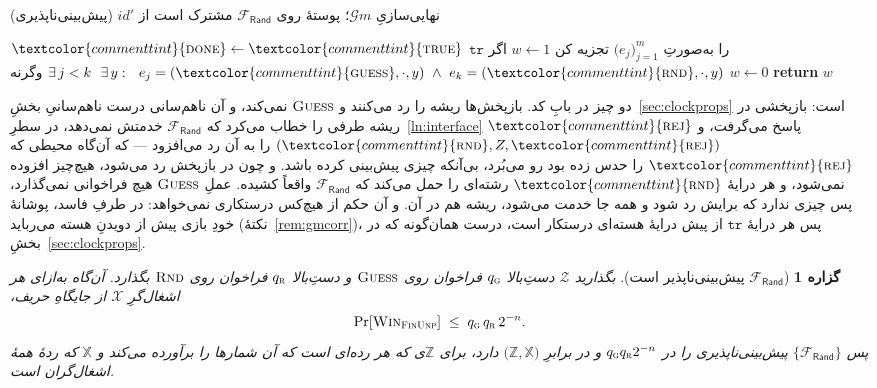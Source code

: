 \documentclass[10pt,oneside,openany]{book}
\makeatletter
\newcommand{\Zenv}{\mathcal{Z}}
\newcommand{\ZenvSet}{\mathbb{Z}}
\newcommand{\op}[1]{\textnormal{\textsc{#1}}}
\newcommand{\opdef}[1]{\hypertarget{op:#1}{\op{#1}}}
\newcommand{\id}{id}
\newcommand{\atom}[1]{\textcolor{commenttint}{\op{#1}}}
\newcommand{\rej}{\atom{rej}}
\newcommand{\true}{\atom{true}}
\newcommand{\Gm}{\mathcal{G}m}
\newcommand{\Xset}{\mathbb{X}}
\newcommand{\Win}{\op{Win}}
\newcommand{\done}{\atom{done}}
\newcommand{\Frand}{\mathcal{F}_{\mathsf{Rand}}}
\newcommand{\V}[1]{\mathtt{#1}}
\newcounter{contline}
\newcommand{\algcont}{\setcounter{ALG@line}{\value{contline}}}
\newcommand{\opsig}[1]{\textcolor{accent}{\underline{\smash{#1}}}}
\theoremstyle{accentdef}
\theoremstyle{accentplain}
\newtheorem{proposition}[definition]{گزاره}
\makeatother
\begin{document}
\begin{interface}[nofloat]{نهایی‌سازیِ $\Gm$؛ پوستهٔ روی $\Frand$ مشترک است}
\opsig{$\id.\opdef{FinUnp}()$} \quad از $\id'$ \quad (پیش‌بینی‌ناپذیری)
\begin{algorithmic}[1]
\algcont
\Req{$\neg\done$}
\Req{$\id.P = Z$}
\State $\done \gets \true$
\State $\V{tr}$ را به‌صورتِ $\bigl(e_j\bigr)_{j=1}^{m}$ تجزیه کن
\State $w \gets 1$ اگر $\exists\, j < k \ \ \exists\, y :\ \
       e_j = (\atom{guess},\cdot,y) \ \wedge\ e_k = (\atom{rnd},\cdot,y)$ \label{ln:gunp}
\State وگرنه $w \gets 0$
\State \textbf{return} $w$
\end{algorithmic}
\end{interface}

دو چیز در بابِ کد. بازپخش‌ها ریشه را رد می‌کنند و $\op{Guess}$ نمی‌کند، و آن
ناهم‌سانی درست ناهم‌سانیِ بخشِ~\ref{sec:clockprops} است: بازپخشی در ریشه
طرفی را خطاب می‌کرد که $\Frand$ خدمتش نمی‌دهد، در
سطرِ~\ref{ln:interface} $\rej$ پاسخ می‌گرفت، و $(\atom{rnd},Z,\rej)$ را به
آن رد می‌افزود --- که آن‌گاه محیطی که $\rej$ را حدس زده بود رو می‌بُرد،
بی‌آنکه چیزی پیش‌بینی کرده باشد. و چون در بازپخش رد می‌شود، هیچ‌چیز افزوده
نمی‌شود، و هر درایهٔ $\atom{rnd}$ رشته‌ای را حمل می‌کند که $\Frand$ واقعاً
کشیده. عملِ $\op{Guess}$ هیچ فراخوانی نمی‌گذارد، پس چیزی ندارد که برایش رد
شود و همه جا خدمت می‌شود، ریشه هم در آن. و آن حکم از هیچ‌کس درستکاری
نمی‌خواهد: در طرفِ فاسد، پوشانهٔ خودِ بازی پیش از دویدنِ هسته می‌رباید
(نکتهٔ~\ref{rem:gmcorr})، پس هر درایهٔ $\V{tr}$ از پیش درایهٔ هسته‌ای درستکار
است، درست همان‌گونه که در بخشِ~\ref{sec:clockprops}.

\begin{proposition}[$\Frand$ پیش‌بینی‌ناپذیر است]\label{prop:randunp}
بگذارید $\Zenv$ دستِ‌بالا $q_{\op{g}}$ فراخوان روی $\op{Guess}$ و
دستِ‌بالا $q_{\op{r}}$ فراخوان روی $\op{Rnd}$ بگذارد. آن‌گاه به‌ازای هر
اشغال‌گرِ $\mathcal{X}$ از جایگاهِ حریف،
\[
  \Pr[\Win_{\op{FinUnp}}] \;\leq\; q_{\op{g}} \, q_{\op{r}} \, 2^{-n} .
\]
پس $\{\Frand\}$ پیش‌بینی‌ناپذیری را در $q_{\op{g}} q_{\op{r}} 2^{-n}$ و در
برابرِ $\bigl(\ZenvSet,\Xset\bigr)$ دارد، برای $\ZenvSet$ی که هر رده‌ای است
که آن شمارها را برآورده می‌کند و $\Xset$ که ردهٔ همهٔ اشغال‌گران است.
\end{proposition}
\end{document}

